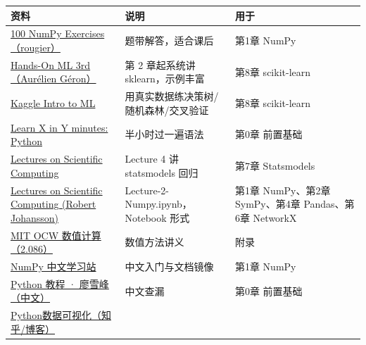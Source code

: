{\def\LTcaptype{none} %
\begin{longtable}[]{@{}
  >{\raggedright\arraybackslash}p{}
  >{\raggedright\arraybackslash}p{}
  >{\raggedright\arraybackslash}p{}@{}}
\toprule\noalign{}
\begin{minipage}[b]{\linewidth}\raggedright
资料
\end{minipage} & \begin{minipage}[b]{\linewidth}\raggedright
说明
\end{minipage} & \begin{minipage}[b]{\linewidth}\raggedright
用于
\end{minipage} \\
\midrule\noalign{}
\endhead
\bottomrule\noalign{}
\endlastfoot
\href{https://github.com/rougier/numpy-100}{100 NumPy
Exercises（rougier）} & 100 题带解答，适合课后 & 第1章 NumPy \\
\href{https://github.com/ageron/handson-ml3}{Hands-On ML 3rd（Aurélien
Géron）} & 第 2 章起系统讲 sklearn，示例丰富 & 第8章 scikit-learn \\
\href{https://www.kaggle.com/learn/intro-to-machine-learning}{Kaggle
Intro to ML} & 用真实数据练决策树/随机森林/交叉验证 & 第8章
scikit-learn \\
\href{https://learnxinyminutes.com/docs/zh-cn/python3-cn/}{Learn X in Y
minutes: Python} & 半小时过一遍语法 & 第0章 前置基础 \\
\href{https://github.com/jrjohansson/scientific-python-lectures}{Lectures
on Scientific Computing} & Lecture 4 讲 statsmodels 回归 & 第7章
Statsmodels \\
\href{https://github.com/jrjohansson/scientific-python-lectures}{Lectures
on Scientific Computing (Robert Johansson)} &
Lecture-2-Numpy.ipynb，Notebook 形式 & 第1章 NumPy、第2章 SymPy、第4章
Pandas、第6章 NetworkX \\
\href{https://ocw.mit.edu/courses/2-086-numerical-computation-for-mechanical-engineers-spring-2013/}{MIT
OCW 数值计算（2.086）} & 数值方法讲义 & 附录 \\
\href{https://numpy.net.cn/learn/}{NumPy 中文学习站} &
中文入门与文档镜像 & 第1章 NumPy \\
\href{https://liaoxuefeng.com/books/python/introduction/}{Python 教程 ·
廖雪峰（中文）} & 中文查漏 & 第0章 前置基础 \\
\href{https://www.zhihu.com/question/582168949}{Python数据可视化（知乎/博客）}

\end{longtable}}
